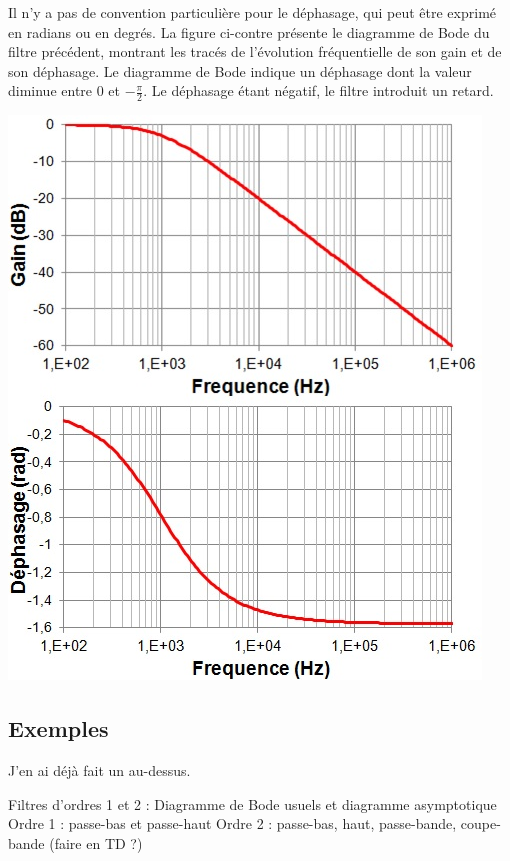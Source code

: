 \documentclass[]{book}
\begin{document}
{	\begin{minipage}[l]{0.4\linewidth}
		Il n'y a pas de convention particulière pour le déphasage, qui peut être exprimé en radians ou en degrés. La figure ci-contre présente le diagramme de Bode du filtre précédent, montrant les tracés de l'évolution fréquentielle de son gain et de son déphasage. Le diagramme de Bode indique un déphasage dont la valeur diminue entre 0 et $-\frac{\pi}{2}$. Le déphasage étant négatif, le filtre introduit un retard.	
	\end{minipage} \hfill
	\begin{minipage}[c]{0.50\linewidth}
			\includegraphics[scale=0.6]{images/Bode_passe-bas.jpg}
	\end{minipage}
	
	
	
	\subsection{Exemples}
	J'en ai déjà fait un au-dessus.
	
	Filtres d'ordres 1 et 2 : Diagramme de Bode usuels et diagramme asymptotique
	Ordre 1 : passe-bas et passe-haut
	Ordre 2 : passe-bas, haut, passe-bande, coupe-bande (faire en TD ?)
	
}
\end{document}
